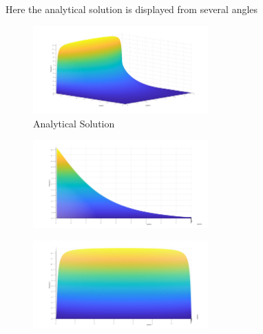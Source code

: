 \documentclass{amsart}
\begin{document}
Here the analytical solution is displayed from several angles 

\begin{figure}[H]
	\caption{Analytical Solution}
	\label{analsol}
    \includegraphics[width=0.6\textwidth]{Asol1.jpg}
\end{figure}
\begin{figure}[H]
    \includegraphics[width=0.6\textwidth]{Asol2.jpg}
\end{figure}
\begin{figure}[H]
    \includegraphics[width=0.6\textwidth]{Asol3.jpg}  
\end{figure}
\end{document}
